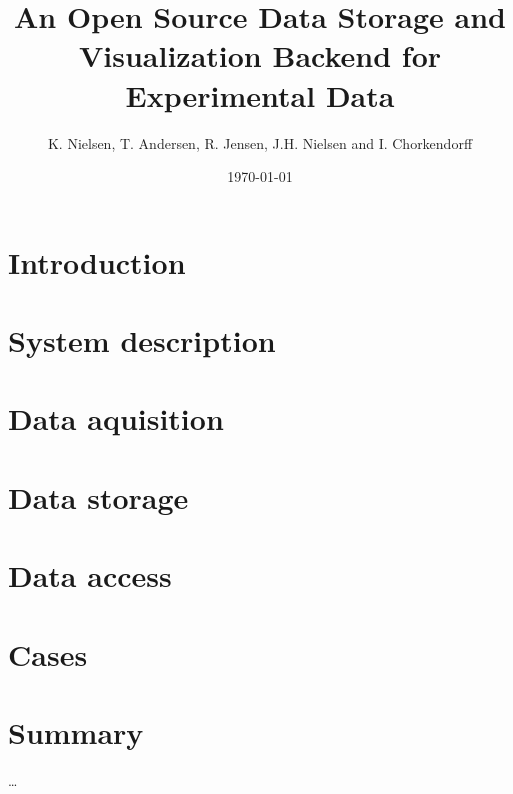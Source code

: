 \documentclass[12pt,draft]{article}
\title{An Open Source Data Storage and Visualization Backend for Experimental
Data}
\author{K. Nielsen, T. Andersen, R. Jensen, J.H. Nielsen and I. Chorkendorff}
\date{\today}
\begin{document}
\doublespacing %
\maketitle

\begin{abstract}

\end{abstract}

\section{Introduction}


\section{System description}


\section{Data aquisition}


\section{Data storage}\label{data_storage}


\section{Data access}\label{sec:data_access}


\section{Cases}


\section{Summary}
\ldots



\end{document}
